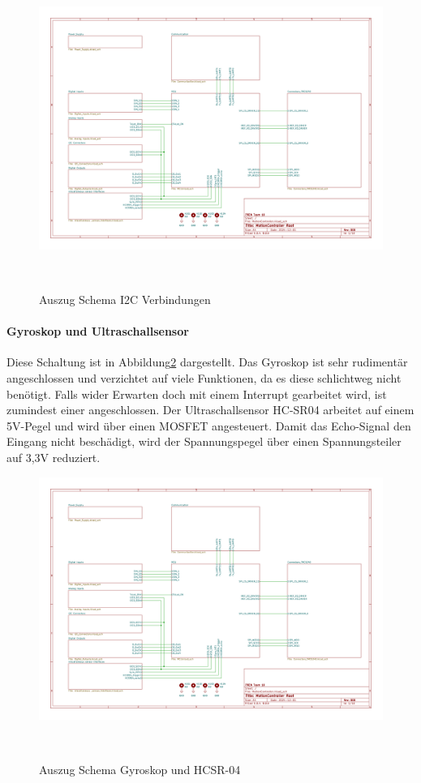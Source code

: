 \documentclass[main.  tex]{subfiles} %
\begin{document}
\begin{figure}[h!]
    \centering
    \includegraphics[page=9,width=\textwidth]{../Anhang_pdfs/MotionController.pdf}
    \caption{Auszug Schema I2C Verbindungen}~\label{fig:Schema_I2C}
\end{figure}

\paragraph{Gyroskop und Ultraschallsensor}
Diese Schaltung ist in Abbildung\ref{fig:Schema_sonstige_Sensoren} dargestellt.
Das Gyroskop ist sehr rudimentär angeschlossen und verzichtet auf viele
Funktionen, da es diese schlichtweg nicht benötigt. Falls wider Erwarten doch
mit einem Interrupt gearbeitet wird, ist zumindest einer angeschlossen. Der
Ultraschallsensor HC-SR04 arbeitet auf einem 5V-Pegel und wird über einen
MOSFET angesteuert. Damit das Echo-Signal den Eingang nicht beschädigt, wird
der Spannungspegel über einen Spannungsteiler auf 3,3V reduziert.

\begin{figure}[h!]
    \centering
    \includegraphics[page=10,width=\textwidth]{../Anhang_pdfs/MotionController.pdf}
    \caption{Auszug Schema Gyroskop und HCSR-04}~\label{fig:Schema_sonstige_Sensoren}
\end{figure}
\end{document}
